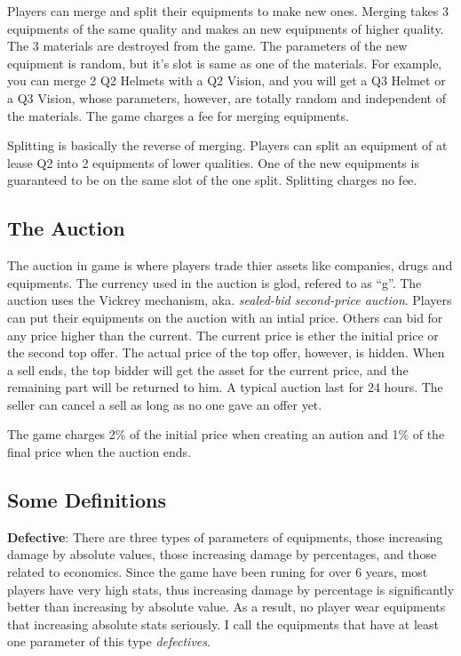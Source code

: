 \documentclass{manuscript}
\begin{document}
    Players can merge and split their equipments to make new ones. Merging takes 3 equipments of the same quality and makes
    an new equipments of higher quality. The 3 materials are destroyed from the game. The parameters of the new equipment
    is random, but it's slot is same as one of the materials. For example, you can merge 2 Q2 Helmets with a Q2 Vision,
    and you will get a Q3 Helmet or a Q3 Vision, whose parameters, however, are totally random and independent of the
    materials. The game charges a fee for merging equipments.

    Splitting is basically the reverse of merging. Players can split an equipment of at lease Q2 into 2 equipments of
    lower qualities. One of the new equipments is guaranteed to be on the same slot of the one split. Splitting charges
    no fee.

    \subsection{The Auction}

    The auction in game is where players trade thier assets like companies, drugs and equipments. The currency used in
    the auction is glod, refered to as ``g''. The auction uses the Vickrey mechanism, aka. \textit{sealed-bid second-price
    auction}. Players can put their equipments on the auction with an intial price. Others can bid for any price higher
    than the current. The current price is ether the initial price or the second top offer. The actual price of the top
    offer, however, is hidden. When a sell ends, the top bidder will get the asset for the current price, and the remaining
    part will be returned to him. A typical auction last for 24 hours. The seller can cancel a sell as long as no one
    gave an offer yet.

    The game charges 2\% of the initial price when creating an aution and 1\% of the final price when the auction ends.

    \subsection{Some Definitions}

    \textbf{Defective}: There are three types of parameters of equipments, those increasing damage by absolute values,
    those increasing damage by percentages, and those related to economics. Since the game have been runing for over 6
    years, most players have very high stats, thus increasing damage by percentage is significantly better than increasing
    by absolute value. As a result, no player wear equipments that increasing absolute stats seriously. I call the equipments
    that have at least one parameter of this type \textit{defectives}.
\end{document}
